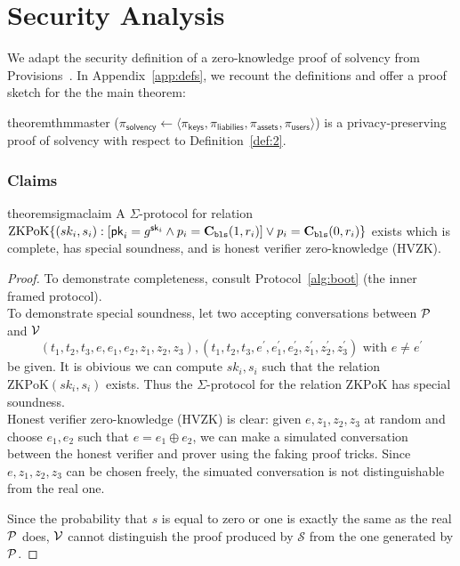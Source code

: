 \chapter{Security Analysis}
\label{sec:proof}

We adapt the security definition of a zero-knowledge proof of solvency from Provisions~\cite{provisions}. In Appendix~\ref{app:defs}, we recount the definitions and offer a proof sketch for the the main theorem:

\begin{restatable}{theorem}{thmmaster}
\label{thm:master}
\Sys ($\pi_\mathsf{solvency}\leftarrow\langle \pi_\mathsf{keys}, \pi_\mathsf{liabilies}, \pi_\mathsf{assets}, \pi_\mathsf{users} \rangle$) is a privacy-preserving proof of solvency with respect to Definition~\ref{def:2}. 
\end{restatable}


\subsection{Claims}
\label{sec:claims}


\begin{restatable}{theorem}{sigmaclaim}
\label{thm:sigmaclaim}
A $\Sigma$-protocol for relation $\mathrm{ZKPoK} \{ (sk_i,s_i) :  [\mathsf{pk}_i=g^{\mathsf{sk}_i} \land p_i=\textbf{C}_\texttt{bls}(1,r_i)  ] \lor p_i=\textbf{C}_\texttt{bls}(0,r_i) \}$ exists which is complete, has special soundness, and is honest verifier zero-knowledge (HVZK).
\end{restatable}

\begin{proof}

To demonstrate completeness, consult Protocol~\ref{alg:boot} (the inner framed protocol). \\
To demonstrate special soundness, let two accepting conversations between $\mathcal{P}$ and $\mathcal{V}$
$$
(t_1,t_2,t_3,e,e_1,e_2,z_1,z_2,z_3),(t_1,t_2,t_3,e^\prime,e_1^\prime,e_2^\prime,z_1^\prime,z_2^\prime,z_3^\prime)\text{ with $e\ne{e^\prime}$}
$$
be given. It is obivious we can compute $sk_i,s_i$ such that the relation $\mathrm{ZKPoK}(sk_i,s_i)$ exists. Thus the $\Sigma$-protocol for the relation $\mathrm{ZKPoK}$ has special soundness. \\
Honest verifier zero-knowledge (HVZK) is clear: given $e,z_1,z_2,z_3$ at random and choose $e_1,e_2$ such that $e=e_1\oplus{e_2}$, we can make a simulated conversation between the honest verifier and prover using the faking proof tricks. Since $e,z_1,z_2,z_3$ can be chosen freely, the simuated conversation is not distinguishable from the real one.

Since the probability that $s$ is equal to zero or one is exactly the same as the real $\mathcal{P}$ does, $\mathcal{V}$ cannot distinguish the proof produced by $\mathcal{S}$ from the one generated by $\mathcal{P}$. \end{proof}


